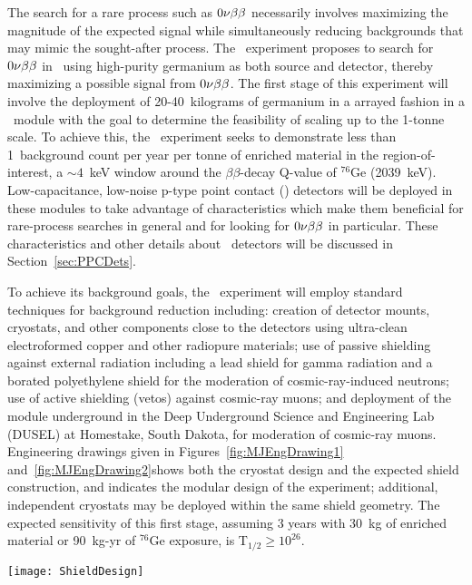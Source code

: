 The search for a rare process such as $0 \nu \beta \beta$ necessarily involves maximizing the magnitude of the expected signal while
simultaneously reducing backgrounds that may mimic the sought-after process.  
The \MJ~experiment proposes to search for $0 \nu \beta \beta$ in \gersevensix~using high-purity
germanium as both source and detector, thereby maximizing a possible signal from $0 \nu \beta \beta$. 
The first stage of this experiment will involve the deployment of 20-40~kilograms of germanium in a arrayed fashion in a \minmod~module with the goal to determine
the feasibility of scaling up to the 1-tonne scale.  To achieve this, the \MJ~experiment seeks to demonstrate less than
1~background count per year per tonne of enriched material in the
region-of-interest, a $\sim4$~keV window around the $\beta\beta$-decay
Q-value of $^{76}$Ge (2039~keV).  Low-capacitance, low-noise p-type point contact (\ppc)
detectors will be deployed in these modules to take advantage of characteristics which make 
them beneficial for rare-process searches in general and for looking for $0 \nu \beta \beta$ in particular.  These characteristics and other details about \ppc~detectors will be discussed in Section~\ref{sec:PPCDets}.  

To achieve its background goals, the \MJ~experiment will employ standard techniques for background reduction including: creation of detector mounts, cryostats, and other components close to the detectors using ultra-clean electroformed copper and other radiopure materials; use of passive shielding against external radiation including a lead shield for gamma radiation and a borated polyethylene shield for the moderation of cosmic-ray-induced neutrons; use of active shielding (vetos) against cosmic-ray muons; and deployment of the module underground in the Deep Underground Science and Engineering Lab (DUSEL) at Homestake, South Dakota, for moderation of cosmic-ray muons.  Engineering drawings given in Figures~\ref{fig:MJEngDrawing1} and~\ref{fig:MJEngDrawing2}shows both the cryostat design and the expected shield construction, and indicates the modular design of the experiment; additional, independent cryostats may be deployed within the same shield geometry.  
The expected sensitivity of this first stage, 
assuming 3 years with 30~kg of enriched material or 90~kg-yr of $^{76}$Ge
exposure, is T$_{1/2}\geq 10^{26}$.  

	
		\begin{sidewaysfigure}
			\centering		
			\def\figheight{0.45\textheight}
			\texttt{[image: ShieldDesign]}
			\caption[\MJ~\minmod~shield geometry]{\MJ~\minmod~shield geometry.  The modular design of the shield will 
			enable a phased deployment of cryostats, allowing sets of detectors to be easily added after initial commissioning of the 
			experiment.}
			\label{fig:MJEngDrawing2}
		\end{sidewaysfigure}
	
